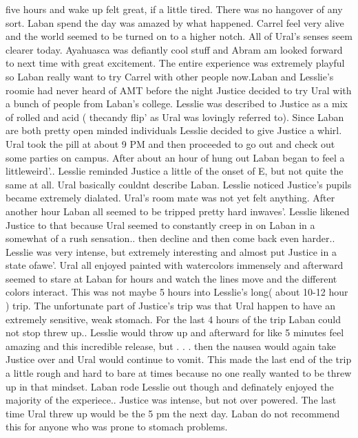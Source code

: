\documentclass[12pt]{book}
\begin{document}
five hours and wake up felt great, if a little tired. There was no hangover of any sort. Laban spend the day was amazed by what happened. Carrel feel very alive and the world seemed to be turned on to a higher notch. All of Ural's senses seem clearer today. Ayahuasca was defiantly cool stuff and Abram am looked forward to next time with great excitement. The entire experience was extremely playful so Laban really want to try Carrel with other people now.Laban and Lesslie's roomie had never heard of AMT before the night Justice decided to try Ural with a bunch of people from Laban's college. Lesslie was described to Justice as a mix of rolled and acid ( thecandy flip' as Ural was lovingly referred to). Since Laban are both pretty open minded individuals Lesslie decided to give Justice a whirl. Ural took the pill at about 9 PM and then proceeded to go out and check out some parties on campus. After about an hour of hung out Laban began to feel a littleweird'.. Lesslie reminded Justice a little of the onset of E, but not quite the same at all. Ural basically couldnt describe Laban. Lesslie noticed Justice's pupils became extremely dialated. Ural's room mate was not yet felt anything. After another hour Laban all seemed to be tripped pretty hard inwaves'. Lesslie likened Justice to that because Ural seemed to constantly creep in on Laban in a somewhat of a rush sensation.. then decline and then come back even harder.. Lesslie was very intense, but extremely interesting and almost put Justice in a state ofawe'. Ural all enjoyed painted with watercolors immensely and afterward seemed to stare at Laban for hours and watch the lines move and the different colors interact. This was not maybe 5 hours into Lesslie's long( about 10-12 hour ) trip. The unfortunate part of Justice's trip was that Ural happen to have an extremely sensitive, weak stomach. For the last 4 hours of the trip Laban could not stop threw up.. Lesslie would throw up and afterward for like 5 minutes feel amazing and this incredible release, but . . .  then the nausea would again take Justice over and Ural would continue to vomit. This made the last end of the trip a little rough and hard to bare at times because no one really wanted to be threw up in that mindset. Laban rode Lesslie out though and definately enjoyed the majority of the experiece.. Justice was intense, but not over powered. The last time Ural threw up would be the 5 pm the next day. Laban do not recommend this for anyone who was prone to stomach problems.
\end{document}
